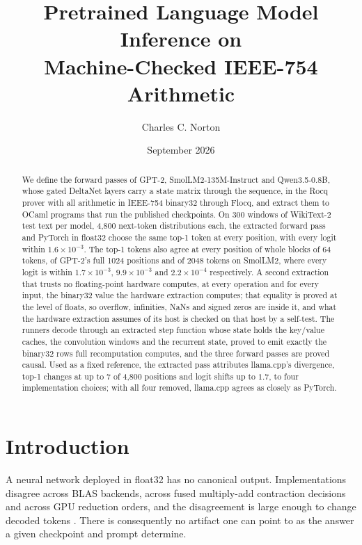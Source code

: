 \documentclass[11pt]{article}
\title{Pretrained Language Model Inference on\\ Machine-Checked IEEE-754 Arithmetic}
\author{Charles C. Norton}
\date{September 2026}
\theoremstyle{plain}
\theoremstyle{definition}
\begin{document}
\maketitle

\begin{abstract}
We define the forward passes of GPT-2, SmolLM2-135M-Instruct and Qwen3.5-0.8B,
whose gated DeltaNet layers carry a state matrix through the sequence, in the
Rocq prover with all arithmetic in IEEE-754 binary32 through Flocq, and extract
them to OCaml programs that run the published checkpoints. On 300 windows of
WikiText-2 test text per model, 4{,}800 next-token distributions each, the
extracted forward pass and PyTorch in float32 choose the same top-1 token at
every position, with every logit within $1.6\times10^{-3}$. The top-1 tokens
also agree at every position of whole blocks of 64 tokens, of GPT-2's full 1024
positions and of 2048 tokens on SmolLM2, where every logit is within
$1.7\times10^{-3}$, $9.9\times10^{-3}$ and $2.2\times10^{-4}$ respectively. A
second extraction that
trusts no floating-point hardware computes, at every operation and for every
input, the binary32 value the hardware extraction computes; that equality is
proved at the level of floats, so overflow, infinities, NaNs and signed zeros
are inside it, and what the hardware extraction assumes of its host is checked
on that host by a self-test. The runners decode through an extracted step
function whose state holds the key/value caches, the convolution windows and
the recurrent state, proved to emit exactly the binary32 rows full
recomputation computes, and the three forward passes are proved causal. Used
as a fixed reference, the extracted pass attributes llama.cpp's divergence, top-1
changes at up to 7 of 4{,}800 positions and logit shifts up to $1.7$, to four
implementation choices; with all four removed, llama.cpp agrees as closely as
PyTorch.
\end{abstract}

\section{Introduction}

A neural network deployed in float32 has no canonical output. Implementations
disagree across BLAS backends, across fused multiply-add contraction decisions
and across GPU reduction orders, and the disagreement is large enough to change
decoded tokens \cite{tinker2025,gensyn2025}. There is consequently no artifact
one can point to as the answer a given checkpoint and prompt determine.
\end{document}
